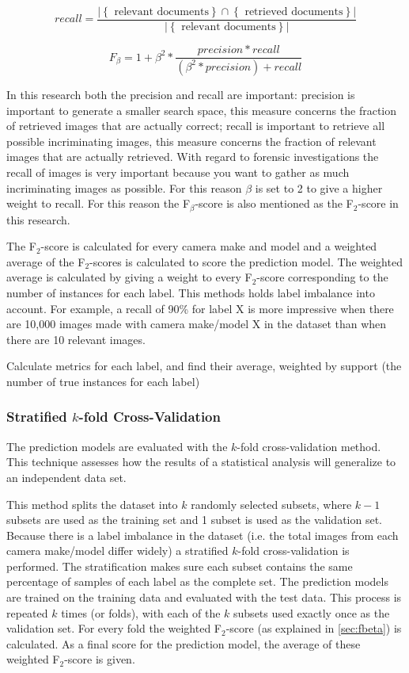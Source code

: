 \begin{equation}\label{eq:1}
recall = \frac{ \left\vert{\left\{ \text{ relevant documents} \right\} \cap \left\{ \text{ retrieved documents} \right\}}\right\vert }{ \left\vert{\left\{ \text{ relevant documents} \right\}}\right\vert}
\end{equation}


\begin{equation}\label{eq:1}
F_\beta = 1 + \beta^{2} * \frac{precision * recall}{(\beta^{2} *precision) + recall}
\end{equation}

In this research both the precision and recall are important: precision is important to generate a smaller search space, this measure concerns the fraction of retrieved images that are actually correct; recall is important to retrieve all possible incriminating images, this measure concerns the fraction of relevant images that are actually retrieved. With regard to forensic investigations the recall of images is very important because you want to gather as much incriminating images as possible. For this reason $\beta$ is set to 2 to give a higher weight to recall. For this reason the F$_\beta$-score is also mentioned as the F$_2$-score in this research.

The F$_2$-score is calculated for every camera make and model and a weighted average of the F$_2$-scores is calculated to score the prediction model. The weighted average is calculated by giving a weight to every F$_2$-score corresponding to the number of instances for each label. This methods holds label imbalance into account. For example, a recall of 90\% for label X is more impressive when there are 10,000 images made with camera make/model X in the dataset than when there are 10 relevant images.

Calculate metrics for each label, and find their average, weighted by support (the number of true instances for each label)

\subsubsection{Stratified $k$-fold Cross-Validation}
The prediction models are evaluated with the $k$-fold cross-validation method. This technique assesses how the results of a statistical analysis will generalize to an independent data set.

This method splits the dataset into $k$ randomly selected subsets, where $k-1$ subsets are used as the training set and 1 subset is used as the validation set. Because there is a label imbalance in the dataset (i.e. the total images from each camera make/model differ widely) a stratified   $k$-fold cross-validation is performed. The stratification makes sure each subset contains the same percentage of samples of each label as the complete set. The prediction models are trained on the training data and evaluated with the test data. This process is repeated $k$ times (or folds), with each of the $k$ subsets used exactly once as the validation set. For every fold the weighted F$_2$-score (as explained in \autoref{sec:fbeta}) is calculated. As a final score for the prediction model, the average of these weighted F$_2$-score is given.

